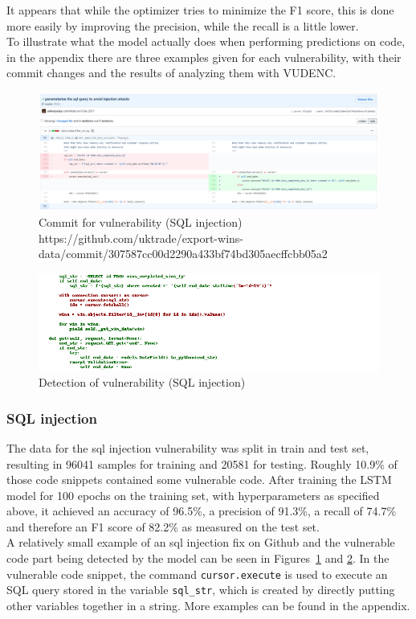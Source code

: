 \documentclass[
a4paper,
pagesize,
pdftex,
12pt,
twoside, %
BCOR=5mm, %
ngerman,
fleqn,
final,
]{scrartcl}
\begin{document}
	It appears that while the optimizer tries to minimize the F1 score, this is done more easily by improving the precision, while the recall is a little lower.\\	
	 To illustrate what the model actually does when performing predictions on code, in the appendix there are three examples given for each vulnerability, with their commit changes and the results of analyzing them with VUDENC.
	
	
	\begin{figure}[H]
		\centering
		\includegraphics[width=\linewidth]{Images/sqlB}
		\caption{Commit for vulnerability (SQL injection) \newline \scriptsize{https://github.com/uktrade/export-wins-data/commit/307587cc00d2290a433bf74bd305aecffcbb05a2}}
		\label{fig:sqlB}
	\end{figure}
	\begin{figure}[H]
		\centering
		\includegraphics[width=\linewidth]{Images/sqlBr}
		\caption{Detection of vulnerability (SQL injection)}
		\label{fig:sqlBr}
	\end{figure}
	\subsubsection{SQL injection}
	The data for the sql injection vulnerability was split in train and test set, resulting in 96041 samples for training and 20581 for testing. Roughly 10.9\% of those code snippets contained some vulnerable code. After training the LSTM model for 100 epochs on the training set, with hyperparameters as specified above, it achieved an accuracy of 96.5\%, a precision of 91.3\%, a recall of 74.7\% and therefore an F1 score of 82.2\% as measured on the test set.\\
	A relatively small example of an sql injection fix on Github and the vulnerable code part being detected by the model can be seen in Figures~\ref{fig:sqlB} and \ref{fig:sqlBr}. In the vulnerable code snippet, the command \texttt{cursor.execute} is used to execute an SQL query stored in the variable \texttt{sql\_str}, which is created by directly putting other variables together in a string. More examples can be found in the appendix.
	
\end{document}
